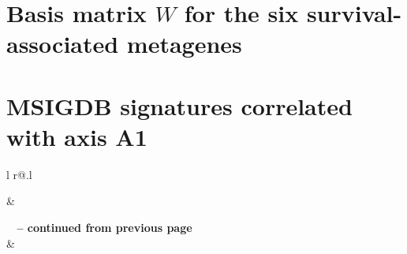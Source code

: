 \appendix
\appendixpage*
\addappheadtotoc

\chapter{Basis matrix \texorpdfstring{$W$}{W} for the six survival-associated metagenes}
\label{app:sigs-w-matrix}


\chapter{\texorpdfstring{\acrshort{MSIGDB}}{MSIGDB} signatures correlated with axis A1}
\label{app:sigs-msigdb-corrs-axis1}
\begin{longtable}[!htbp]{ l r@{.}l }
\caption[\texorpdfstring{\acrshort{MSIGDB}}{MSIGDB} signatures correlated with axis A1]{\acrshort{MSIGDB} signatures substantially correlated with activity of the prognostic axis A1.}

\hline {} &  \\ \hline
\endfirsthead

{{\bfseries \tablename\ \thetable{} -- continued from previous page}} \\
\hline {} &  \\ \hline
\endhead

\hline {} \\
\endfoot

\hline \hline
\endlastfoot


\end{longtable}
